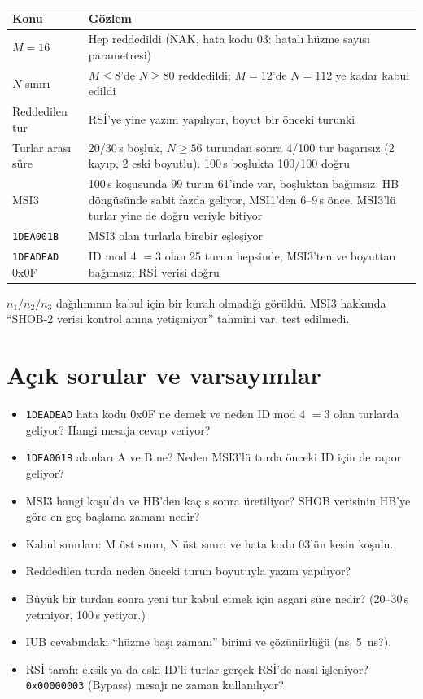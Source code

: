 \documentclass[11pt,a4paper]{article}
\newcommand{\us}{\,\textmu{}s}
\newcommand{\kod}[1]{\texttt{#1}}
\begin{document}
\begin{longtable}{@{}p{3.2cm}p{11.7cm}@{}}
\toprule
Konu & Gözlem \\
\midrule
\endhead
$M=16$ & Hep reddedildi (NAK, hata kodu 03: hatalı hüzme sayısı parametresi) \\
$N$ sınırı & $M\le 8$'de $N\ge 80$ reddedildi; $M=12$'de $N=112$'ye kadar kabul edildi \\
Reddedilen tur & RSİ'ye yine yazım yapılıyor, boyut bir önceki turunki \\
Turlar arası süre & 20/30\us{} boşluk, $N\ge 56$ turundan sonra 4/100 tur başarısız
(2 kayıp, 2 eski boyutlu). 100\us{} boşlukta 100/100 doğru \\
MSI3 & 100\us{} koşusunda 99 turun 61'inde var, boşluktan bağımsız. HB döngüsünde
sabit fazda geliyor, MSI1'den 6--9\us{} önce. MSI3'lü turlar yine de doğru veriyle
bitiyor \\
\kod{1DEA001B} & MSI3 olan turlarla birebir eşleşiyor \\
\kod{1DEADEAD} 0x0F & ID mod 4 $=3$ olan 25 turun hepsinde, MSI3'ten ve boyuttan
bağımsız; RSİ verisi doğru \\
\bottomrule
\end{longtable}

$n_1/n_2/n_3$ dağılımının kabul için bir kuralı olmadığı görüldü. MSI3 hakkında
``SHOB-2 verisi kontrol anına yetişmiyor'' tahmini var, test edilmedi.

\section{Açık sorular ve varsayımlar}

\begin{itemize}[label=$\square$]
  \item \kod{1DEADEAD} hata kodu 0x0F ne demek ve neden ID mod 4 $=3$ olan
        turlarda geliyor? Hangi mesaja cevap veriyor?
  \item \kod{1DEA001B} alanları A ve B ne? Neden MSI3'lü turda önceki ID için de
        rapor geliyor?
  \item MSI3 hangi koşulda ve HB'den kaç \textmu{}s sonra üretiliyor? SHOB verisinin
        HB'ye göre en geç başlama zamanı nedir?
  \item Kabul sınırları: M üst sınırı, N üst sınırı ve hata kodu 03'ün kesin koşulu.
  \item Reddedilen turda neden önceki turun boyutuyla yazım yapılıyor?
  \item Büyük bir turdan sonra yeni tur kabul etmek için asgari süre nedir?
        (20--30\us{} yetmiyor, 100\us{} yetiyor.)
  \item IUB cevabındaki ``hüzme başı zamanı'' birimi ve çözünürlüğü (ns, 5~ns?).
  \item RSİ tarafı: eksik ya da eski ID'li turlar gerçek RSİ'de nasıl işleniyor?
        \kod{0x00000003} (Bypass) mesajı ne zaman kullanılıyor?
\end{itemize}
\end{document}
